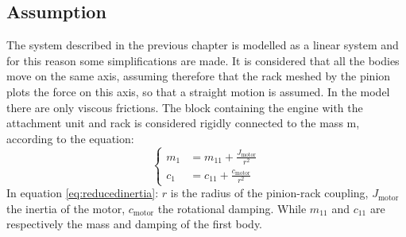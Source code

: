 \subsection{Assumption}
\label{subsec:assumption}
The system described in the previous chapter is modelled as a linear system and
for this reason some simplifications are made.
It is considered that all the bodies move on the same axis, assuming therefore 
that the rack meshed by the pinion plots the force on this axis, so that a 
straight motion is assumed.
In the model there are only viscous frictions.
The block containing the engine with the attachment unit and rack is considered 
rigidly connected to the mass m, according to the equation:
\begin{equation}
	\label{eq:reducedinertia}
	\begin{cases}
		m_{1} &=  m_{11} + \frac{J_{\text{motor}}}{r^2}\\
		c_{1} &=  c_{11} + \frac{c_{\text{motor}}}{r^2}
	\end{cases}
\end{equation}
In equation \eqref{eq:reducedinertia}: $r$ is the radius of the pinion-rack 
coupling, $J_{\text{motor}}$ the inertia of the motor, $c_{\text{motor}}$ the 
rotational damping. 
While $m_{11}$ and $c_{11}$ are respectively the mass and damping of the first body.
%
